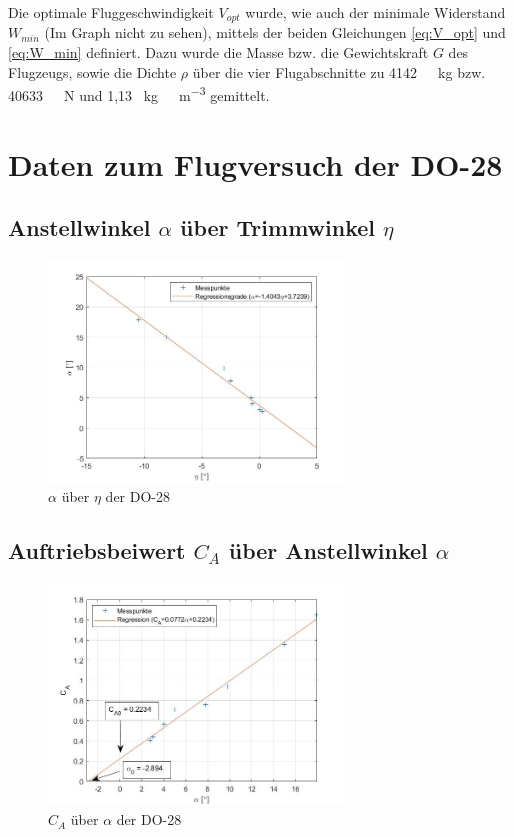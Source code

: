 Die optimale Fluggeschwindigkeit $V_{opt}$ wurde, wie auch der minimale Widerstand $W_{min}$ (Im Graph nicht zu sehen), mittels der beiden Gleichungen \ref{eq:V_opt} und \ref{eq:W_min} definiert. Dazu wurde die Masse bzw. die Gewichtskraft $G$ des Flugzeugs, sowie die Dichte $\rho$ über die vier Flugabschnitte zu \SI{4142}{\ \kilogram} bzw. \SI{40633}{\ \newton} und 1,13 \SI{}{\kilogram\ \meter^{-3}} gemittelt.

\section{Daten zum Flugversuch der DO-28}

\subsection{Anstellwinkel $\alpha$ über Trimmwinkel $\eta$}

\begin{figure}[H]
	\centering	\includegraphics[width=0.7\textwidth]{./Bilder/alpha_eta_plot.jpg}
	\caption{$\alpha$ über $\eta$ der DO-28}
	\label{fig:alpha_eta_DO28}
\end{figure}

\subsection{Auftriebsbeiwert $C_{A}$ über Anstellwinkel $\alpha$}

\begin{figure}[H]
	\centering	\includegraphics[width=0.7\textwidth]{./Bilder/CA_alpha_plot.jpg}
	\caption{$C_{A}$ über $\alpha$ der DO-28}
	\label{fig:CA_alpha_DO28}
\end{figure}

